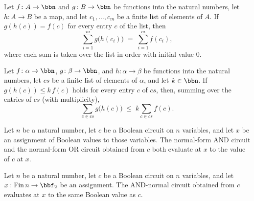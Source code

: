 \begin{theorem}
\label{BoolCircuit.foldr_add_map}
\leanok
{}
Let $f\colon A \to \bbn$ and $g\colon B \to \bbn$ be functions into the natural numbers,
let $h\colon A \to B$ be a map, and let $c_1,\dots,c_m$ be a finite list of elements of
$A$. If $g(h(c)) = f(c)$ for every entry $c$ of the list, then
\[
\sum_{i=1}^{m} g\bigl(h(c_i)\bigr) \;=\; \sum_{i=1}^{m} f(c_i),
\]
where each sum is taken over the list in order with initial value $0$.
\end{theorem}

\begin{theorem}
\label{BoolCircuit.foldr_add_map_le}
\leanok
{}
Let $f\colon\alpha\to\bbn$, $g\colon\beta\to\bbn$, and $h\colon\alpha\to\beta$ be
functions into the natural numbers, let $cs$ be a finite list of elements of $\alpha$,
and let $k\in\bbn$. If $g(h(c)) \le k\, f(c)$ holds for every entry $c$ of $cs$, then,
summing over the entries of $cs$ (with multiplicity),
\[ \sum_{c \in cs} g\bigl(h(c)\bigr) \;\le\; k \sum_{c \in cs} f(c). \]
\end{theorem}

\begin{theorem}
\label{BoolCircuit.toNAnd_toNOr_eval}
\leanok
{}
Let $n$ be a natural number, let $c$ be a Boolean circuit on $n$ variables, and let $x$
be an assignment of Boolean values to those variables. The normal-form AND circuit and
the normal-form OR circuit obtained from $c$ both evaluate at $x$ to the value of $c$ at
$x$.
\end{theorem}

\begin{theorem}
\label{BoolCircuit.toNAnd_eval}
\leanok
{}
Let $n$ be a natural number, let $c$ be a Boolean circuit on $n$ variables, and let $x :
\mathrm{Fin}\,n \to \bbf_2$ be an assignment. The AND-normal circuit obtained from
$c$ evaluates at $x$ to the same Boolean value as $c$.
\end{theorem}

